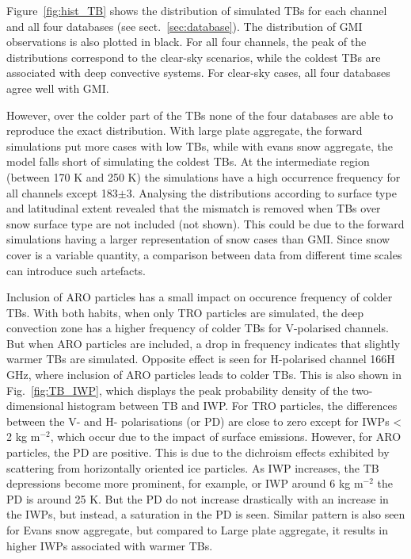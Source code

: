 \documentclass[amt, manuscript]{copernicus}
\begin{document}
Figure~\ref{fig:hist_TB} shows the distribution of simulated TBs for each channel and all four databases (see sect.~\ref{sec:database}). The distribution of GMI observations is also plotted in black. For all four channels, the peak of the distributions correspond to the clear-sky scenarios, while the coldest TBs are associated with deep convective systems. For clear-sky cases, all four databases agree well with GMI.

However, over the colder part of the TBs none of the four databases are able to reproduce the exact distribution. With large plate aggregate, the forward simulations put more cases with low TBs, while with evans snow aggregate, the model falls short of simulating the coldest TBs. At the intermediate region (between 170\,\,K and 250\,\,K) the simulations have a high occurrence frequency for all channels except 183$\pm$3. Analysing the distributions according to surface type and latitudinal extent revealed that the mismatch is removed when TBs over snow surface type are not included (not shown). This could be due to the forward simulations having a larger representation of snow cases than GMI. Since snow cover is a variable quantity, a comparison between data from different time scales can introduce such artefacts. 

Inclusion of ARO particles has a small impact on occurence frequency of colder TBs. With both habits, when only TRO particles are simulated, the deep convection zone has a higher frequency of colder TBs for V-polarised channels. But when ARO particles are included, a drop in frequency indicates that slightly warmer TBs are simulated. Opposite effect is seen for H-polarised channel 166H\,\,GHz, where inclusion of ARO particles leads to colder TBs. This is also shown in Fig.~\ref{fig:TB_IWP}, which displays the peak probability density of the two-dimensional histogram between TB and IWP. For TRO particles, the differences between the V- and H- polarisations (or PD) are close to zero except for IWPs < 2\,\,kg m$^{-2}$, which occur due to the impact of surface emissions. However, for ARO particles, the PD are positive. This is due to the dichroism effects exhibited by scattering from horizontally oriented ice particles. As IWP increases, the TB depressions become more prominent, for example, or IWP around 6\,\,kg m$^{-2}$ the PD is around 25\,\,K. But the PD do not increase drastically with an increase in the IWPs, but instead, a saturation in the PD is seen. Similar pattern is also seen for Evans snow aggregate, but compared to Large plate aggregate, it results in higher IWPs associated with warmer TBs. 
\end{document}
